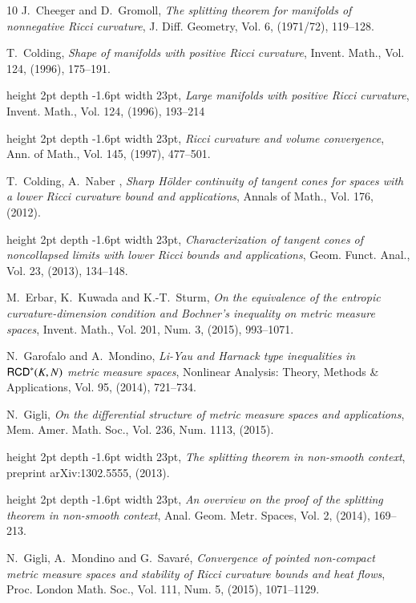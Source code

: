 \documentclass[11pt,reqno]{amsart}
\newcommand{\RCD}{{\sf RCD}}
\theoremstyle{definition}
\theoremstyle{remark}
\theoremstyle{remark}
\theoremstyle{remark}
\theoremstyle{remark}
\theoremstyle{remark}
\theoremstyle{remark}
\theoremstyle{remark}
\begin{document}
\begin{thebibliography}{10}
{\sc J.~Cheeger and D.~Gromoll},
{\em The splitting theorem for manifolds of nonnegative Ricci curvature}, J. Diff. Geometry, Vol. 6, (1971/72),  119--128.

 {\sc T.~Colding},
 {\em Shape of manifolds with positive Ricci curvature},
 Invent. Math., Vol. 124, (1996), 175--191.

 \leavevmode\vrule height 2pt depth -1.6pt width 23pt,
 {\em Large manifolds with positive Ricci curvature},
 Invent. Math., Vol. 124, (1996), 193--214

 \leavevmode\vrule height 2pt depth -1.6pt width 23pt,
 {\em {R}icci curvature and volume convergence},
  Ann. of Math., Vol. 145, (1997), 477--501.
 
 
{\sc T.~Colding, A.~Naber },
{\em Sharp H\"older continuity of tangent cones for spaces with a lower Ricci curvature bound and applications}, Annals of Math., Vol. 176, (2012).
 
\leavevmode\vrule height 2pt depth -1.6pt width 23pt,
{\em Characterization of tangent cones of noncollapsed limits
with lower Ricci bounds and applications},   Geom. Funct. Anal., Vol. 23, (2013), 134--148.

  {\sc M.~Erbar, K.~Kuwada and K.-T.~Sturm},
  {\em On the equivalence of the entropic curvature-dimension condition and {B}ochner's inequality on metric measure spaces}, Invent. Math., Vol. 201, Num. 3,  (2015), 993--1071.
  

{\sc  N.~Garofalo and A.~Mondino}, 
{\em Li-Yau and Harnack type inequalities in $\RCD^*(K,N)$ metric measure spaces},  Nonlinear Analysis: Theory, Methods \& Applications, Vol. 95, (2014), 721--734.

{\sc N.~Gigli}, {\em On the differential structure of metric measure spaces and
  applications},  Mem. Amer. Math. Soc., Vol. 236, Num. 1113,  (2015).  

\leavevmode\vrule height 2pt depth -1.6pt width 23pt,
{\em The splitting theorem in non-smooth context}, preprint arXiv:1302.5555, (2013).

\leavevmode\vrule height 2pt depth -1.6pt width 23pt,
{\em An overview on the proof of the splitting theorem in non-smooth context}, Anal. Geom. Metr. Spaces, Vol. 2, (2014), 169--213. 


{\sc N.~Gigli, A.~Mondino and G.~Savar\'e},
{\em Convergence of pointed non-compact metric measure spaces and stability of Ricci curvature bounds and heat flows},  Proc. London Math. Soc.,  Vol. 111, Num. 5, (2015), 1071--1129. 


\end{thebibliography}
\end{document}
